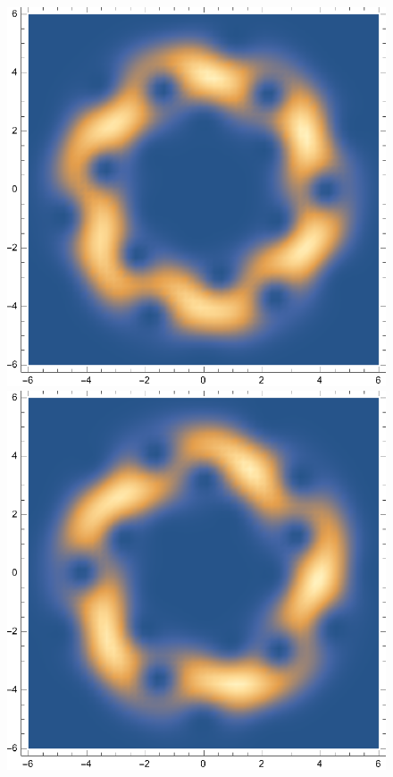 \documentclass{article}
\theoremstyle{definition}
\begin{document}
\begin{enumerate}[label=\alph*)]
\begin{figure}[!htb]
\begin{minipage}{.24\textwidth}
	\end{minipage}%
	\begin{minipage}{.24\textwidth}
  	\centering
  	\includegraphics[width=.7\linewidth]{figures/5-20.eps}
	\end{minipage}
	\begin{minipage}{.24\textwidth}
  	\centering
  	\includegraphics[width=.7\linewidth]{figures/5-24.eps}
	\end{minipage}
	\begin{minipage}{.24\textwidth}
  	\centering

\end{minipage}
\end{figure}
\end{enumerate}
\end{document}
